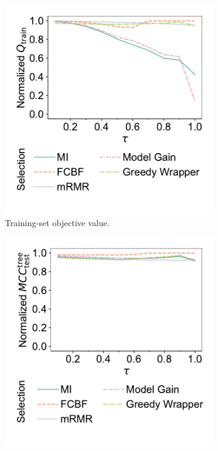 \documentclass{article}
\theoremstyle{definition}
\begin{document}
\begin{figure}[htb]
	\centering
	\begin{subfigure}[t]{0.48\textwidth}
		\centering
		\includegraphics[width=\textwidth, trim=20 40 15 15, clip]{plots/afs-impact-tau-fs-method-train-objective-max.pdf}
		\caption{Training-set objective value.}
		\label{fig:afs:impact-tau-fs-method-train-objective-max}
	\end{subfigure}
	\hfill
	\begin{subfigure}[t]{0.48\textwidth}
		\centering
		\includegraphics[width=\textwidth, trim=20 40 15 15, clip]{plots/afs-impact-tau-fs-method-decision-tree-test-mcc-max.pdf}

\end{subfigure}
\end{figure}
\end{document}
